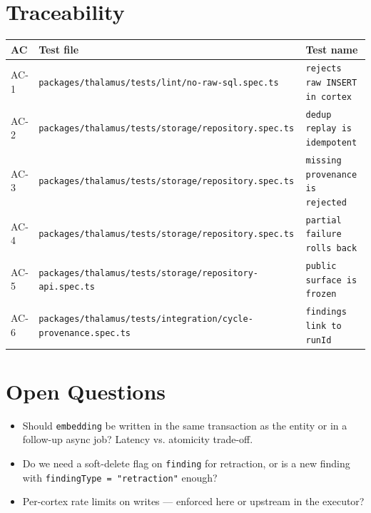 \section{Traceability}

\begin{center}
\begin{tabular}{@{}lll@{}}
\toprule
AC & Test file & Test name \\
\midrule
AC-1 & \texttt{packages/thalamus/tests/lint/no-raw-sql.spec.ts} & \texttt{rejects raw INSERT in cortex} \\
AC-2 & \texttt{packages/thalamus/tests/storage/repository.spec.ts} & \texttt{dedup replay is idempotent} \\
AC-3 & \texttt{packages/thalamus/tests/storage/repository.spec.ts} & \texttt{missing provenance is rejected} \\
AC-4 & \texttt{packages/thalamus/tests/storage/repository.spec.ts} & \texttt{partial failure rolls back} \\
AC-5 & \texttt{packages/thalamus/tests/storage/repository-api.spec.ts} & \texttt{public surface is frozen} \\
AC-6 & \texttt{packages/thalamus/tests/integration/cycle-provenance.spec.ts} & \texttt{findings link to runId} \\
\bottomrule
\end{tabular}
\end{center}

\section{Open Questions}
\begin{itemize}[leftmargin=1.2em]
  \item Should \texttt{embedding} be written in the same transaction as the entity or in a
        follow-up async job? Latency vs. atomicity trade-off.
  \item Do we need a soft-delete flag on \texttt{finding} for retraction, or is a new
        finding with \texttt{findingType = "retraction"} enough?
  \item Per-cortex rate limits on writes --- enforced here or upstream in the executor?
\end{itemize}



